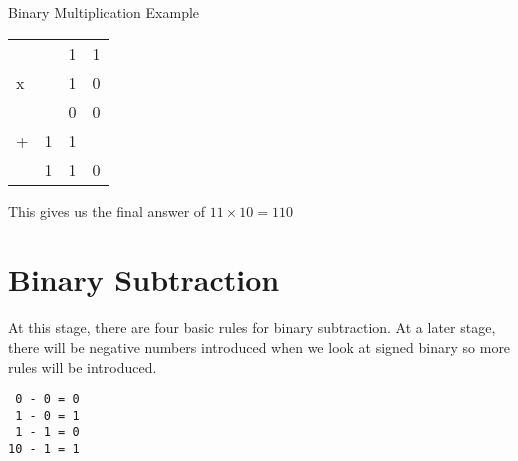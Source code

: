 \begin{example}{Binary Multiplication Example}
\begin{enumerate}
\begin{table}[H]
        \centering
        \begin{tabularx}{0.2\textwidth}{XXXX}
             &  & 1 & 1 \\
            x &  & 1 & 0 \\
            \hline
             &  & 0 & 0 \\
            + & 1 & 1 & \\
             \hline
             & 1 & 1 & 0\\
        \end{tabularx}
    \end{table}
\end{enumerate}
This gives us the final answer of $11\times 10 = 110$
\end{example}

\section*{Binary Subtraction}
At this stage, there are four basic rules for binary subtraction. At a later stage, there will be negative numbers introduced when we look at signed binary so more rules will be introduced. 
\begin{verbatim}
 0 - 0 = 0
 1 - 0 = 1 
 1 - 1 = 0
10 - 1 = 1
\end{verbatim}
